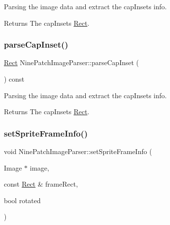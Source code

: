 Parsing the image data and extract the cap\+Insets info. \begin{DoxyReturn}{Returns}
The cap\+Insets \hyperlink{classRect}{Rect}. 
\end{DoxyReturn}
\mbox{\label{classNinePatchImageParser_a85313610f427ab890684f3c5fc4fe3c7}} 
\subsubsection{\texorpdfstring{parse\+Cap\+Inset()}{parseCapInset()}\hspace{0.1cm}{\footnotesize\ttfamily [2/2]}}
{\footnotesize\ttfamily \hyperlink{classRect}{Rect} Nine\+Patch\+Image\+Parser\+::parse\+Cap\+Inset (\begin{DoxyParamCaption}{ }\end{DoxyParamCaption}) const}

Parsing the image data and extract the cap\+Insets info. \begin{DoxyReturn}{Returns}
The cap\+Insets \hyperlink{classRect}{Rect}. 
\end{DoxyReturn}
\mbox{\label{classNinePatchImageParser_a304418601a8d21cc6cd894158b605ea3}} 
\subsubsection{\texorpdfstring{set\+Sprite\+Frame\+Info()}{setSpriteFrameInfo()}\hspace{0.1cm}{\footnotesize\ttfamily [1/2]}}
{\footnotesize\ttfamily void Nine\+Patch\+Image\+Parser\+::set\+Sprite\+Frame\+Info (\begin{DoxyParamCaption}\item[{Image $\ast$}]{image,  }\item[{const \hyperlink{classRect}{Rect} \&}]{frame\+Rect,  }\item[{bool}]{rotated }\end{DoxyParamCaption})}

